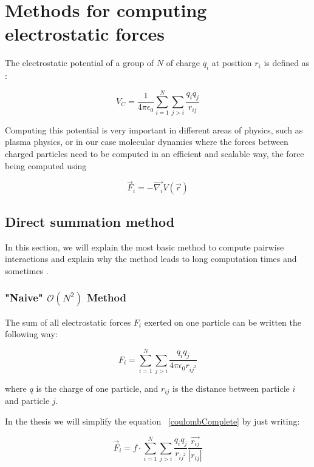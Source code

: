 \documentclass[10pt,twoside,a4paper]{report}
\begin{document}
\chapter{Methods for computing electrostatic forces}

The electrostatic potential of a group of $N$ of charge $q_i$ at position $r_i$ is defined as :

\begin{equation}
V_C = \frac{1}{4\pi\epsilon_0} \sum\limits_{i=1}^{N}\sum\limits_{j>i} \frac{q_i q_j}{r_{ij}}
\end{equation}

Computing this potential is very important in different areas of physics, such as plasma physics, or in our case molecular dynamics where the forces between charged particles need to be computed in an efficient and scalable way, the force being computed using

\begin{equation}
	\vec{F}_i = - \vec{\nabla_i} V(\vec{r})
\end{equation}


\section{Direct summation method }


In this section, we will explain the most basic method to compute pairwise interactions and explain why the method leads to long computation times and sometimes .

\subsection{"Naive" $\mathcal{O}(N^2)$ Method}

The sum of all electrostatic forces $F_i$ exerted  on one particle can be written the following way:

\begin{equation}
	F_i =  \sum\limits_{i=1}^{N}\sum\limits_{j>i} \frac{q_i q_j}{4\pi\epsilon_0 r_{ij^2}}
	\label{coulombComplete}
\end{equation}

where $q$ is the charge of one particle, and $r_{ij}$ is the distance between particle $i$ and particle $j$.

In the thesis we will simplify the equation ~\eqref{coulombComplete} by just writing:

\begin{equation}
	\vec{F}_i =  f\cdot\sum\limits_{i=1}^{N}\sum\limits_{j>i} \frac{q_i q_j}{r_{ij^2}} \frac{\vec{r_{ij}}}{|r_{ij}|}
	\label{coulombSimplified}
\end{equation}
\end{document}
